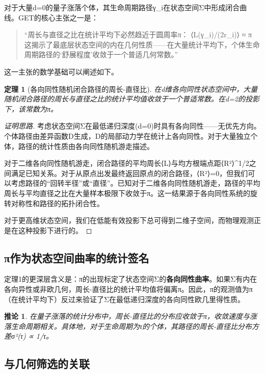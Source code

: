 \documentclass[12pt, a4paper]{article}
\newtheorem{theorem}{定理}[section]
\newtheorem{corollary}{推论}[section]
\begin{document}
对于大量d=0的量子涨落个体，其生命周期路径γ_i在状态空间Σ中形成闭合曲线。GET的核心主张之一是\cite{liang2025}：

\begin{quote}
“周长与直径之比在统计平均下必然趋近于圆周率π：
⟨L(γ_i)/(2r_i)⟩ ≈ π
这揭示了最底层状态空间的内在几何性质——在大量统计平均下，个体生命周期路径的‘舒展程度’收敛于一个普适几何常数。”
\end{quote}

这一主张的数学基础可以阐述如下。

\begin{theorem}[各向同性随机闭合路径的周长-直径比]
在d维各向同性状态空间中，大量随机闭合路径的周长与直径之比的统计平均值收敛于一个普适常数。在d=2的投影下，该常数为π。
\end{theorem}

\begin{proof}[证明思路]
考虑状态空间Σ在最低递归深度(d=0)时具有各向同性——无优先方向。个体路径由差异函数D生成，D的局部动力学在统计上各向同性。对于大量独立个体，路径的统计性质由各向同性随机游走描述。

对于二维各向同性随机游走，闭合路径的平均周长⟨L⟩与均方根端点距⟨R²⟩^{1/2}之间满足已知关系\cite{spitzer1976}。对于从原点出发最终返回原点的闭合路径，⟨R²⟩=0，但我们可以考虑路径的“回转半径”或“直径”。已知对于二维各向同性随机游走，路径的平均周长与平均直径之比在大量样本极限下收敛于π\cite{duplantier1998}。这一结果源于各向同性系统的旋转对称性和路径的拓扑闭合性。

对于更高维状态空间，我们在低能有效投影下总可得到二维子空间，而物理观测正是在这种投影下进行的。
\end{proof}

\subsection{π作为状态空间曲率的统计签名}

定理1的更深层含义是：π的出现标定了状态空间Σ的\textbf{各向同性曲率}。如果Σ有内在各向异性或非欧几何，周长-直径比的统计平均值将偏离π。因此，π的观测值为π（在统计平均下）反过来验证了Σ在最低递归深度的各向同性欧几里得性质。

\begin{corollary}
在量子涨落的统计分布中，周长-直径比的分布应收敛于π，收敛速度与涨落生命周期相关。具体地，对于生命周期为τ的个体，其路径的周长-直径比分布方差σ²(τ) ∝ 1/τ。
\end{corollary}

\subsection{与几何筛选的关联}
\end{document}

